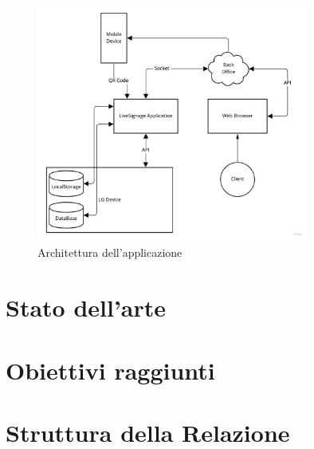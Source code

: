 \begin{figure}[!htb]
    \label{fig:architettura}
    \centering
    \includegraphics[width= 0.8\textwidth]{images/Introduzione/architettura.jpg} 
    \caption{Architettura dell'applicazione} 
\end{figure}

\section{Stato dell'arte}
\section{Obiettivi raggiunti}
\section{Struttura della Relazione}